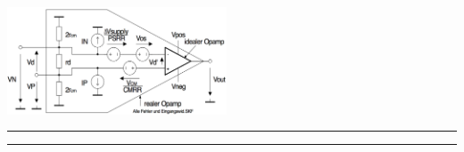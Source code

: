     \begin{minipage}[b]{6.5cm}
      \includegraphics[width=6.5cm]{./bilder/OPAmpAlleFehler}
    \end{minipage}
\hrule
\hrule
